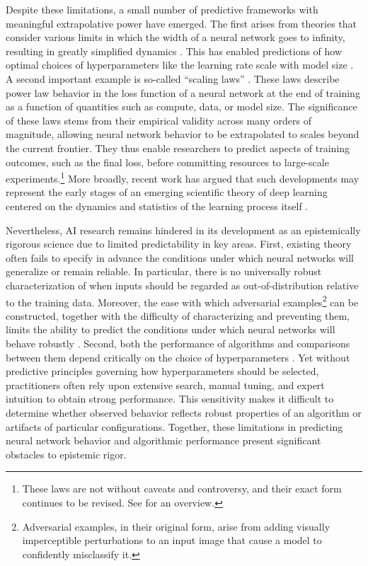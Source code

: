 \documentclass{article}
\begin{document}
Despite these limitations, a small number of predictive frameworks with meaningful extrapolative power have emerged.
The first arises from theories that consider various limits in which the width of a neural network goes to infinity, resulting in greatly simplified dynamics \cite{jacot2018neural, Lee2019WideNeuralNetworksLinear, mei2019meanfield, yang2022tensor}.
This has enabled predictions of how optimal choices of hyperparameters like the learning rate scale with model size \cite{yang2022tensor}.
A second important example is so-called ``scaling laws'' \cite{hestness2017deeplearningscalingpredictable, kaplan2020scalinglawsneurallanguage}.
These laws describe power law behavior in the loss function of a neural network at the end of training as a function of quantities such as compute, data, or model size.
The significance of these laws stems from their empirical validity across many orders of magnitude, allowing neural network behavior to be extrapolated to scales beyond the current frontier.
They thus enable researchers to predict aspects of training outcomes, such as the final loss, before committing resources to large-scale experiments.\footnote{These laws are not without caveats and controversy, and their exact form continues to be revised. See \cite{hooker2025slowdeath} for an overview.}
More broadly, recent work has argued that such developments may represent the early stages of an emerging scientific theory of deep learning centered on the dynamics and statistics of the learning process itself \cite{Simon2026ScientificTheoryDL}.

Nevertheless, AI research remains hindered in its development as an epistemically rigorous science due to limited predictability in key areas.
First, existing theory often fails to specify in advance the conditions under which neural networks will generalize or remain reliable.
In particular, there is no universally robust characterization of when inputs should be regarded as out-of-distribution relative to the training data.
Moreover, the ease with which adversarial examples\footnote{Adversarial examples, in their original form, arise from adding visually imperceptible perturbations to an input image that cause a model to confidently misclassify it.} can be constructed, together with the difficulty of characterizing and preventing them, limits the ability to predict the conditions under which neural networks will behave robustly \cite{GoodfellowShlensSzegedy2015AdversarialExamples}.
Second, both the performance of algorithms and comparisons between them depend critically on the choice of hyperparameters \cite{lucic2017_are_gans_created_equal, henderson2018deep, Bouthillier2021accounting}.
Yet without predictive principles governing how hyperparameters should be selected, practitioners often rely upon extensive search, manual tuning, and expert intuition to obtain strong performance.
This sensitivity makes it difficult to determine whether observed behavior reflects robust properties of an algorithm or artifacts of particular configurations.
Together, these limitations in predicting neural network behavior and algorithmic performance present significant obstacles to epistemic rigor.
\end{document}
